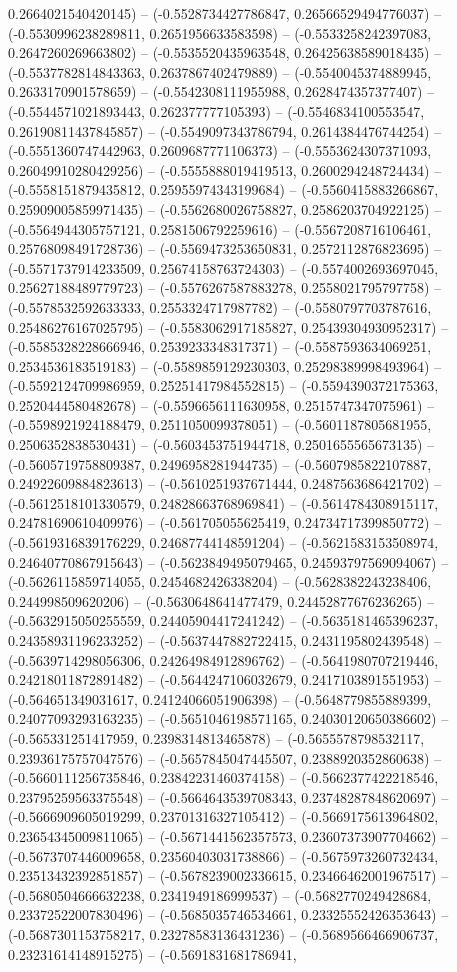 0.2664021540420145) -- (-0.5528734427786847, 0.26566529494776037) -- (-0.5530996238289811, 0.2651956633583598) -- (-0.5533258242397083, 0.2647260269663802) -- (-0.5535520435963548, 0.26425638589018435) -- (-0.5537782814843363, 0.2637867402479889) -- (-0.5540045374889945, 0.2633170901578659) -- (-0.5542308111955988, 0.2628474357377407) -- (-0.5544571021893443, 0.262377777105393) -- (-0.5546834100553547, 0.26190811437845857) -- (-0.5549097343786794, 0.2614384476744254) -- (-0.5551360747442963, 0.2609687771106373) -- (-0.5553624307371093, 0.26049910280429256) -- (-0.5555888019419513, 0.2600294248724434) -- (-0.5558151879435812, 0.25955974343199684) -- (-0.5560415883266867, 0.25909005859971435) -- (-0.5562680026758827, 0.2586203704922125) -- (-0.5564944305757121, 0.2581506792259616) -- (-0.5567208716106461, 0.25768098491728736) -- (-0.5569473253650831, 0.2572112876823695) -- (-0.5571737914233509, 0.25674158763724303) -- (-0.5574002693697045, 0.25627188489779723) -- (-0.5576267587883278, 0.2558021795797758) -- (-0.5578532592633333, 0.2553324717987782) -- (-0.5580797703787616, 0.25486276167025795) -- (-0.5583062917185827, 0.25439304930952317) -- (-0.5585328228666946, 0.2539233348317371) -- (-0.5587593634069251, 0.2534536183519183) -- (-0.5589859129230303, 0.25298389998493964) -- (-0.5592124709986959, 0.25251417984552815) -- (-0.5594390372175363, 0.2520444580482678) -- (-0.5596656111630958, 0.2515747347075961) -- (-0.5598921924188479, 0.2511050099378051) -- (-0.5601187805681955, 0.2506352838530431) -- (-0.5603453751944718, 0.2501655565673135) -- (-0.5605719758809387, 0.2496958281944735) -- (-0.5607985822107887, 0.24922609884823613) -- (-0.5610251937671444, 0.2487563686421702) -- (-0.5612518101330579, 0.24828663768969841) -- (-0.5614784308915117, 0.24781690610409976) -- (-0.561705055625419, 0.24734717399850772) -- (-0.5619316839176229, 0.24687744148591204) -- (-0.5621583153508974, 0.24640770867915643) -- (-0.5623849495079465, 0.24593797569094067) -- (-0.5626115859714055, 0.2454682426338204) -- (-0.5628382243238406, 0.244998509620206) -- (-0.5630648641477479, 0.24452877676236265) -- (-0.5632915050255559, 0.24405904417241242) -- (-0.5635181465396237, 0.24358931196233252) -- (-0.5637447882722415, 0.2431195802439548) -- (-0.5639714298056306, 0.24264984912896762) -- (-0.5641980707219446, 0.24218011872891482) -- (-0.5644247106032679, 0.2417103891551953) -- (-0.564651349031617, 0.24124066051906398) -- (-0.5648779855889399, 0.24077093293163235) -- (-0.5651046198571165, 0.24030120650386602) -- (-0.565331251417959, 0.2398314813465878) -- (-0.5655578798532117, 0.23936175757047576) -- (-0.5657845047445507, 0.2388920352860638) -- (-0.5660111256735846, 0.23842231460374158) -- (-0.5662377422218546, 0.23795259563375548) -- (-0.5664643539708343, 0.23748287848620697) -- (-0.5666909605019299, 0.23701316327105412) -- (-0.5669175613964802, 0.23654345009811065) -- (-0.5671441562357573, 0.23607373907704662) -- (-0.5673707446009658, 0.23560403031738866) -- (-0.5675973260732434, 0.23513432392851857) -- (-0.5678239002336615, 0.23466462001967517) -- (-0.5680504666632238, 0.2341949186999537) -- (-0.5682770249428684, 0.23372522007830496) -- (-0.5685035746534661, 0.23325552426353643) -- (-0.5687301153758217, 0.23278583136431236) -- (-0.5689566466906737, 0.23231614148915275) -- (-0.5691831681786941, 